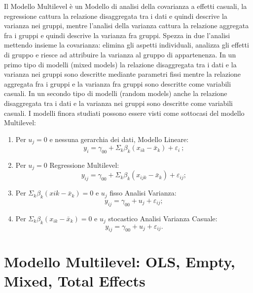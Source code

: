 \documentclass[a4page, 11pt]{article}
\begin{document}
Il Modello Multilevel è un Modello di analisi della covarianza a effetti casuali, la regressione cattura la relazione disaggregata tra i dati e quindi descrive la varianza nei gruppi, mentre l’analisi della varianza cattura la relazione aggregata fra i gruppi e quindi descrive la varianza fra gruppi. Spezza in due l’analisi mettendo insieme la covarianza: elimina gli aspetti individuali, analizza gli effetti di gruppo e riesce ad attribuire la varianza al gruppo di appartenenza.
\newline
In un primo tipo di modelli (mixed models) la relazione disaggregata tra i dati e la varianza nei gruppi sono descritte mediante parametri fissi mentre la relazione aggregata fra i gruppi
e la varianza fra gruppi sono descritte come variabili casuali.
\newline
In un secondo tipo di modelli (random models) anche la relazione disaggregata tra i dati e la varianza nei gruppi sono descritte come variabili casuali.
\newline
\newline
I modelli finora studiati possono essere visti come sottocasi del modello Multilevel:
\begin{enumerate}
\item Per $u_j=0$ e nessuna gerarchia dei dati, Modello Lineare: 
\begin{equation*}
y_i= \gamma_{00}+\Sigma_k \beta_k(x_{ik}-\bar{x}_k) + \varepsilon_i \ ;
\end{equation*}
\item Per $u_j=0$ Regressione Multilevel: 
\begin{equation*}
y_{ij} = \gamma_{00} + \Sigma_k \beta_k(x_{ijk}-\bar{x}_k) + \varepsilon_{ij};
\end{equation*}
\item Per $\Sigma_k \beta_k (x{ik} - \bar{x}_k) = 0$ e $u_j$ fisso Analisi Varianza: 
\begin{equation*}
y_{ij} = \gamma_{00}+ u_j + \varepsilon_{ij};
\end{equation*}
\item Per $\Sigma_k\beta_k(x_{ik}- \bar{x}_k) = 0$ e $u_j$ stocastico Analisi Varianza Casuale: 
\begin{equation*}
y_{ij} = \gamma_{00} + u_j + \varepsilon_{ij}.
\end{equation*}
\end{enumerate}

\section{Modello Multilevel: OLS, Empty, Mixed, Total Effects}
\end{document}
